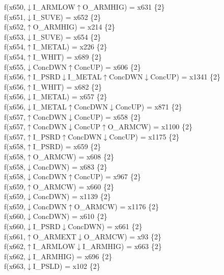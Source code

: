 f(x650,$\downarrow$I\_ARMLOW$\uparrow$O\_ARMHIG) = x631 \{2\} \\  
f(x651,$\downarrow$I\_SUVE) = x652 \{2\} \\  
f(x652,$\uparrow$O\_ARMHIG) = x214 \{2\} \\  
f(x653,$\downarrow$I\_SUVE) = x654 \{2\} \\  
f(x654,$\uparrow$I\_METAL) = x226 \{2\} \\  
f(x654,$\uparrow$I\_WHIT) = x689 \{2\} \\  
f(x655,$\downarrow$ConcDWN$\uparrow$ConcUP) = x606 \{2\} \\  
f(x656,$\uparrow$I\_PSRD$\downarrow$I\_METAL$\uparrow$ConcDWN$\downarrow$ConcUP) = x1341 \{2\} \\  
f(x656,$\uparrow$I\_WHIT) = x682 \{2\} \\  
f(x656,$\downarrow$I\_METAL) = x657 \{2\} \\  
f(x656,$\downarrow$I\_METAL$\uparrow$ConcDWN$\downarrow$ConcUP) = x871 \{2\} \\  
f(x657,$\uparrow$ConcDWN$\downarrow$ConcUP) = x658 \{2\} \\  
f(x657,$\uparrow$ConcDWN$\downarrow$ConcUP$\uparrow$O\_ARMCW) = x1100 \{2\} \\  
f(x657,$\uparrow$I\_PSRD$\uparrow$ConcDWN$\downarrow$ConcUP) = x1175 \{2\} \\  
f(x658,$\uparrow$I\_PSRD) = x659 \{2\} \\  
f(x658,$\uparrow$O\_ARMCW) = x608 \{2\} \\  
f(x658,$\downarrow$ConcDWN) = x683 \{2\} \\  
f(x658,$\downarrow$ConcDWN$\uparrow$ConcUP) = x967 \{2\} \\  
f(x659,$\uparrow$O\_ARMCW) = x660 \{2\} \\  
f(x659,$\downarrow$ConcDWN) = x1139 \{2\} \\  
f(x659,$\downarrow$ConcDWN$\uparrow$O\_ARMCW) = x1176 \{2\} \\  
f(x660,$\downarrow$ConcDWN) = x610 \{2\} \\  
f(x660,$\downarrow$I\_PSRD$\downarrow$ConcDWN) = x661 \{2\} \\  
f(x661,$\uparrow$O\_ARMEXT$\downarrow$O\_ARMCW) = x93 \{2\} \\  
f(x662,$\uparrow$I\_ARMLOW$\downarrow$I\_ARMHIG) = x663 \{2\} \\  
f(x662,$\downarrow$I\_ARMHIG) = x696 \{2\} \\  
f(x663,$\downarrow$I\_PSLD) = x102 \{2\} \\  
